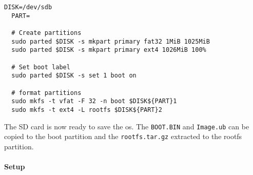 \begin{lstlisting}[style=bash, caption={Prepair SD card}, label=lst:create_partitions]
  DISK=/dev/sdb
  PART=

  # Create partitions
  sudo parted $DISK -s mkpart primary fat32 1MiB 1025MiB
  sudo parted $DISK -s mkpart primary ext4 1026MiB 100%

  # Set boot label
  sudo parted $DISK -s set 1 boot on

  # format partitions
  sudo mkfs -t vfat -F 32 -n boot $DISK${PART}1
  sudo mkfs -t ext4 -L rootfs $DISK${PART}2
\end{lstlisting}

The SD card is now ready to save the \acrshort{os}.
The \texttt{BOOT.BIN} and \texttt{Image.ub} can be copied to the boot partition and the \texttt{rootfs.tar.gz} extracted to the rootfs partition.

\paragraph{Setup}
